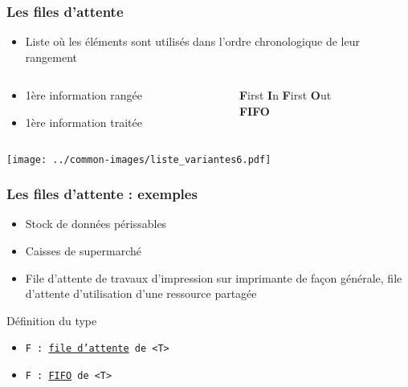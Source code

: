 \documentclass[table,handout,tikz,12pt,svgnames]{beamer}
\begin{document}
\begin{frame}[fragile=singleslide]
	\frametitle{Les files d'attente}
	\begin{block}{}
		\begin{itemize}
			\item  Liste où les éléments sont utilisés dans l'ordre chronologique de leur rangement
		\end{itemize}
	\end{block}
		\begin{columns}[c]
			\hspace{-0.5cm}
			\begin{column}{0.7\textwidth}
				\begin{itemize}
					\item 1ère information rangée
					\item 1ère information traitée
				\end{itemize}
			\end{column}
			\hspace{-1.3cm}
			\vrule{}
			\hspace{0.3cm}
			\begin{column}{0.38\textwidth}
				\begin{center}
					\textbf{F}irst \textbf{I}n \textbf{F}irst \textbf{O}ut\\ \textbf{FIFO}
				\end{center}
			\end{column}
		\end{columns}	
		\begin{center}
			\hspace{-0.83cm}
			{\texttt{[image: ../common-images/liste\_variantes6.pdf]}}
		\end{center}
\end{frame}


\begin{frame}[fragile=singleslide]
	\frametitle{Les files d'attente : exemples}
	\begin{block}{}
		\begin{itemize}
			\item Stock de données périssables
			\item Caisses de supermarché
			\item File d'attente de travaux d'impression sur imprimante de façon générale, file d'attente d'utilisation d'une ressource partagée
		\end{itemize}
	\end{block}
	\begin{block}{Définition du type}
		\begin{itemize}
			\item \texttt{F : \underline{file d'attente} de <T>}
			\item \texttt{F : \underline{FIFO} de <T>}
		\end{itemize}
	\end{block}
\end{frame}
\end{document}
